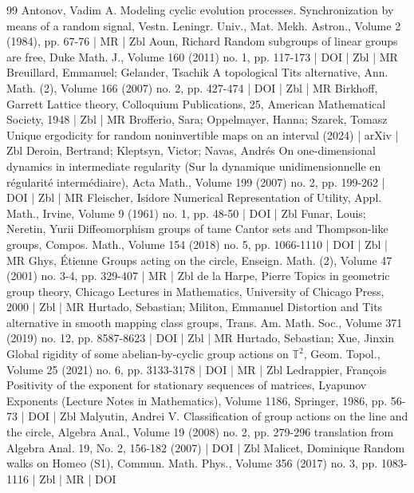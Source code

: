 \documentclass[10pt]{amsart}
\theoremstyle{definition}\newtheorem{defi}[theo]{Definition}\newtheorem{rema}[theo]{Remark}\newtheorem{exam}[theo]{Example}\newtheorem{exem}[theo]{Example}\newtheorem{nota}[theo]{Notation}
\begin{document}
\begin{thebibliography}{99}
 Antonov, Vadim A. Modeling cyclic evolution processes. Synchronization by means of a random signal, Vestn. Leningr. Univ., Mat. Mekh. Astron., Volume 2 (1984), pp. 67-76 | MR | Zbl
 Aoun, Richard Random subgroups of linear groups are free, Duke Math. J., Volume 160 (2011) no. 1, pp. 117-173 | DOI | Zbl | MR
 Breuillard, Emmanuel; Gelander, Tsachik A topological Tits alternative, Ann. Math. (2), Volume 166 (2007) no. 2, pp. 427-474 | DOI | Zbl | MR
 Birkhoff, Garrett Lattice theory, Colloquium Publications, 25, American Mathematical Society, 1948 | Zbl | MR
 Brofferio, Sara; Oppelmayer, Hanna; Szarek, Tomasz Unique ergodicity for random noninvertible maps on an interval (2024) | arXiv | Zbl
 Deroin, Bertrand; Kleptsyn, Victor; Navas, Andrés On one-dimensional dynamics in intermediate regularity (Sur la dynamique unidimensionnelle en régularité intermédiaire), Acta Math., Volume 199 (2007) no. 2, pp. 199-262 | DOI | Zbl | MR
 Fleischer, Isidore Numerical Representation of Utility, Appl. Math., Irvine, Volume 9 (1961) no. 1, pp. 48-50 | DOI | Zbl
 Funar, Louis; Neretin, Yurii Diffeomorphism groups of tame Cantor sets and Thompson-like groups, Compos. Math., Volume 154 (2018) no. 5, pp. 1066-1110 | DOI | Zbl | MR
 Ghys, Étienne Groups acting on the circle, Enseign. Math. (2), Volume 47 (2001) no. 3-4, pp. 329-407 | MR | Zbl
 de la Harpe, Pierre Topics in geometric group theory, Chicago Lectures in Mathematics, University of Chicago Press, 2000 | Zbl | MR
 Hurtado, Sebastian; Militon, Emmanuel Distortion and Tits alternative in smooth mapping class groups, Trans. Am. Math. Soc., Volume 371 (2019) no. 12, pp. 8587-8623 | DOI | Zbl | MR
 Hurtado, Sebastian; Xue, Jinxin Global rigidity of some abelian-by-cyclic group actions on $\mathbb{T}^2$, Geom. Topol., Volume 25 (2021) no. 6, pp. 3133-3178 | DOI | MR | Zbl
 Ledrappier, François Positivity of the exponent for stationary sequences of matrices, Lyapunov Exponents (Lecture Notes in Mathematics), Volume 1186, Springer, 1986, pp. 56-73 | DOI | Zbl
 Malyutin, Andrei V. Classification of group actions on the line and the circle, Algebra Anal., Volume 19 (2008) no. 2, pp. 279-296 translation from Algebra Anal. 19, No. 2, 156-182 (2007) | DOI | Zbl
 Malicet, Dominique Random walks on Homeo (S1), Commun. Math. Phys., Volume 356 (2017) no. 3, pp. 1083-1116 | Zbl | MR | DOI

\end{thebibliography}
\end{document}
